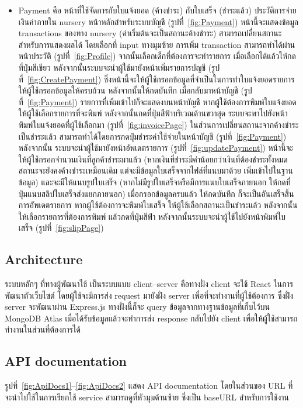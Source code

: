 \begin{itemize}
  \item  Payment คือ หน้าที่ใช้จัดการกับใบแจ้งยอด (ค้างชำระ) กับใบเสร็จ (ชำระแล้ว) ประวัติการจ่ายเงินค่าภายใน nursery หน้าหลักสำหรับระบบบัญชี (รูปที่~\ref{fig:Payment}) หน้านี้จะแสดงข้อมูล transactions ของทาง nursery (ค่าเริ่มต้นจะเป็นสถานะค้างชำระ) สามารถเปลี่ยนสถานะสำหรับการแสดงผลได้ โดยเลือกที่ input ทางมุมซ้าย 
  การเพิ่ม transaction สามารถทำได้ผ่านหน้าประวัติ (รูปที่~\ref{fig:Profile}) จากนั้นเลือกเด็กที่ต้องการจะทำรายการ เมื่อเลือกได้แล้วให้กดที่ปุ่มสีเขียว
  หลังจากนั้นระบบจะนำผู้ใช้มายังหน้าเพิ่มรายการบัญชี (รูปที่~\ref{fig:CreatePayment}) ซึ่งหน้านี้จะให้ผู้ใช้กรอกข้อมูลที่จำเป็นในการทำใบแจ้งยอดรายการ ให้ผู้ใช้กรอกข้อมูลให้ครบถ้วน หลังจากนั้นให้กดบันทึก
  เมื่อกลับมาหน้าบัญชี (รูปที่~\ref{fig:Payment}) รายการที่เพิ่มเข้าไปก็จะแสดงบนหน้าบัญชี หากผู้ใช้ต้องการพิมพ์ใบแจ้งยอด ให้ผู้ใช้เลือกรายการที่จะพิมพ์ หลังจากนั้นกดที่ปุ่มสีฟ้าบริเวณด้านขวาสุด
  ระบบจะพาไปยังหน้าพิมพ์ใบแจ้งยอดที่ผู้ใช้เลือกมา (รูปที่~\ref{fig:invoicePage}) 
  ในส่วนการเปลี่ยนสถานะจากค้างชำระเป็นชำระแล้ว สามารถทำได้โดยการกดปุ่มชำระค่าใช้จ่ายในหน้าบัญชี (รูปที่~\ref{fig:Payment}) หลังจากนั้น ระบบจะนำผู้ใช้มายังหน้าอัพเดตรายการ (รูปที่~\ref{fig:updatePayment})
  หน้านี้จะให้ผู้ใช้กรอกจำนวนเงินที่ลูกค้าชำระมาแล้ว (หากเงินที่ชำระมีค่าน้อยกว่าเงินที่ต้องชำระทั้งหมด สถานะจะยังคงค้างชำระเหมือนเดิม แต่จะมีข้อมูลใบเสร็จจากไฟล์ที่แนบมาด้วย เพิ่มเข้าไปในฐานข้อมูล) และจะมีให้แนบรูปใบเสร็จ (หากไม่มีรูปใบเสร็จหรือมีการแนบใบเสร็จภายนอก ให้กดที่ปุ่มแนบสลิปใบเสร็จส่งแยกภายนอก)
  เมื่อกรอกข้อมูลครบแล้ว ให้กดบันทึก ก็จะเป็นอันเสร็จสิ้นการอัพเดตรายการ หากผู้ใช้ต้องการจะพิมพ์ใบเสร็จ
  ให้ผู้ใช้เลือกสถานะเป็นชำระแล้ว หลังจากนั้นให้เลือกรายการที่ต้องการพิมพ์ แล้วกดที่ปุ่มสีฟ้า
  หลังจากนั้นระบบจะนำผู้ใช้ไปยังหน้าพิมพ์ใบเสร็จ (รูปที่~\ref{fig:slipPage}) 

\end{itemize}

\subsection{Architecture}

ระบบหลักๆ ที่ทางผู้พัฒนาใช้ เป็นระบบแบบ client--server คือทางฝั่ง client จะใช้ React ในการพัฒนาตัวเว็บไซต์ โดยผู้ใช้จะมีการส่ง request มายังฝั่ง server เพื่อที่จะทำงานที่ผู้ใช้ต้องการ ซึ่งฝั่ง server 
จะพัฒนาผ่าน Express.js ทางฝั่งนี้ก็จะ query ข้อมูลจากทางฐานข้อมูลที่เก็บไว้บน MongoDB Atlas เมื่อได้รับข้อมูลแล้วจะทำการส่ง response กลับไปยัง client เพื่อให้ผู้ใช้สามารถทำงานในส่วนที่ต้องการได้

\subsection{API documentation}
รูปที่~\ref{fig:ApiDocs1}--\ref{fig:ApiDocs2} แสดง API documentation โดยในส่วนของ URL ที่จะนำไปใช้ในการเรียกใช้ service สามารถดูที่หัวมุมด้านซ้าย ซึ่งเป็น baseURL สำหรับการใช้งาน

